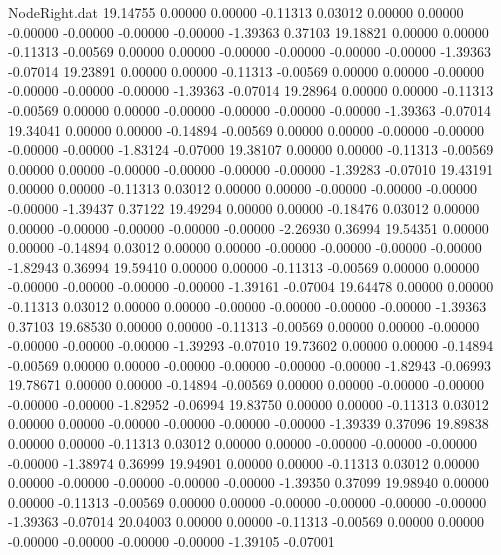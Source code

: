 \begin{filecontents}{NodeRight.dat}
  19.14755    0.00000    0.00000    -0.11313    0.03012    0.00000    0.00000   -0.00000   -0.00000   -0.00000   -0.00000   -1.39363    0.37103
  19.18821    0.00000    0.00000    -0.11313   -0.00569    0.00000    0.00000   -0.00000   -0.00000   -0.00000   -0.00000   -1.39363   -0.07014
  19.23891    0.00000    0.00000    -0.11313   -0.00569    0.00000    0.00000   -0.00000   -0.00000   -0.00000   -0.00000   -1.39363   -0.07014
  19.28964    0.00000    0.00000    -0.11313   -0.00569    0.00000    0.00000   -0.00000   -0.00000   -0.00000   -0.00000   -1.39363   -0.07014
  19.34041    0.00000    0.00000    -0.14894   -0.00569    0.00000    0.00000   -0.00000   -0.00000   -0.00000   -0.00000   -1.83124   -0.07000
  19.38107    0.00000    0.00000    -0.11313   -0.00569    0.00000    0.00000   -0.00000   -0.00000   -0.00000   -0.00000   -1.39283   -0.07010
  19.43191    0.00000    0.00000    -0.11313    0.03012    0.00000    0.00000   -0.00000   -0.00000   -0.00000   -0.00000   -1.39437    0.37122
  19.49294    0.00000    0.00000    -0.18476    0.03012    0.00000    0.00000   -0.00000   -0.00000   -0.00000   -0.00000   -2.26930    0.36994
  19.54351    0.00000    0.00000    -0.14894    0.03012    0.00000    0.00000   -0.00000   -0.00000   -0.00000   -0.00000   -1.82943    0.36994
  19.59410    0.00000    0.00000    -0.11313   -0.00569    0.00000    0.00000   -0.00000   -0.00000   -0.00000   -0.00000   -1.39161   -0.07004
  19.64478    0.00000    0.00000    -0.11313    0.03012    0.00000    0.00000   -0.00000   -0.00000   -0.00000   -0.00000   -1.39363    0.37103
  19.68530    0.00000    0.00000    -0.11313   -0.00569    0.00000    0.00000   -0.00000   -0.00000   -0.00000   -0.00000   -1.39293   -0.07010
  19.73602    0.00000    0.00000    -0.14894   -0.00569    0.00000    0.00000   -0.00000   -0.00000   -0.00000   -0.00000   -1.82943   -0.06993
  19.78671    0.00000    0.00000    -0.14894   -0.00569    0.00000    0.00000   -0.00000   -0.00000   -0.00000   -0.00000   -1.82952   -0.06994
  19.83750    0.00000    0.00000    -0.11313    0.03012    0.00000    0.00000   -0.00000   -0.00000   -0.00000   -0.00000   -1.39339    0.37096
  19.89838    0.00000    0.00000    -0.11313    0.03012    0.00000    0.00000   -0.00000   -0.00000   -0.00000   -0.00000   -1.38974    0.36999
  19.94901    0.00000    0.00000    -0.11313    0.03012    0.00000    0.00000   -0.00000   -0.00000   -0.00000   -0.00000   -1.39350    0.37099
  19.98940    0.00000    0.00000    -0.11313   -0.00569    0.00000    0.00000   -0.00000   -0.00000   -0.00000   -0.00000   -1.39363   -0.07014
  20.04003    0.00000    0.00000    -0.11313   -0.00569    0.00000    0.00000   -0.00000   -0.00000   -0.00000   -0.00000   -1.39105   -0.07001

\end{filecontents}
